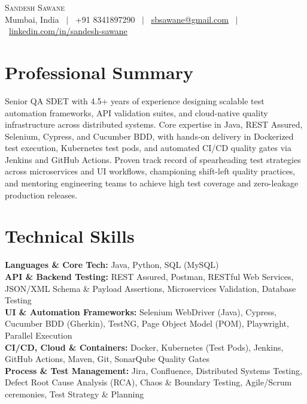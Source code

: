 \documentclass[letterpaper,10pt]{article}
\begin{document}
\begin{center}
    {\Huge \scshape Sandesh Sawane} \\ \vspace{4pt}
    \small Mumbai, India \ $|$ \ +91 8341897290 \ $|$ \ \href{mailto:sbsawane@gmail.com}{\underline{sbsawane@gmail.com}} \ $|$ \ \href{https://linkedin.com/in/sandesh-sawane}{\underline{linkedin.com/in/sandesh-sawane}}
\end{center}


\section{Professional Summary}
\small{Senior QA SDET with 4.5+ years of experience designing scalable test automation frameworks, API validation suites, and cloud-native quality infrastructure across distributed systems. Core expertise in Java, REST Assured, Selenium, Cypress, and Cucumber BDD, with hands-on delivery in Dockerized test execution, Kubernetes test pods, and automated CI/CD quality gates via Jenkins and GitHub Actions. Proven track record of spearheading test strategies across microservices and UI workflows, championing shift-left quality practices, and mentoring engineering teams to achieve high test coverage and zero-leakage production releases.}


\section{Technical Skills}
\begin{itemize}[leftmargin=0.15in, label={}]
    \small{\item{
     \textbf{Languages \& Core Tech:} Java, Python, SQL (MySQL) \\
     \textbf{API \& Backend Testing:} REST Assured, Postman, RESTful Web Services, JSON/XML Schema \& Payload Assertions, Microservices Validation, Database Testing \\
     \textbf{UI \& Automation Frameworks:} Selenium WebDriver (Java), Cypress, Cucumber BDD (Gherkin), TestNG, Page Object Model (POM), Playwright, Parallel Execution \\
     \textbf{CI/CD, Cloud \& Containers:} Docker, Kubernetes (Test Pods), Jenkins, GitHub Actions, Maven, Git, SonarQube Quality Gates \\
     \textbf{Process \& Test Management:} Jira, Confluence, Distributed Systems Testing, Defect Root Cause Analysis (RCA), Chaos \& Boundary Testing, Agile/Scrum ceremonies, Test Strategy \& Planning
    }}
\end{itemize}
\vspace{-10pt}
\end{document}
